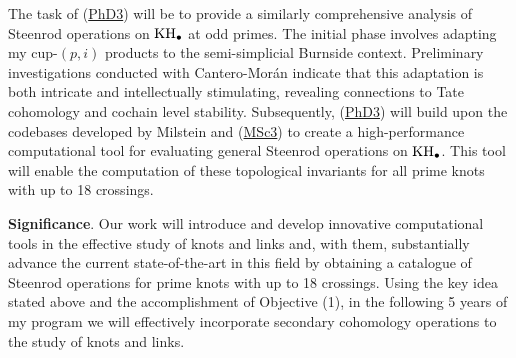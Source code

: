 \quad The task of (\underline{PhD3}) will be to provide a similarly comprehensive analysis of Steenrod operations on $\mathrm{KH}_\bullet$ at odd primes.
The initial phase involves adapting my cup-$(p,i)$ products \cite{medina2021may_st} to the semi-simplicial Burnside context.
Preliminary investigations conducted with Cantero-Mor\'an indicate that this adaptation is both intricate and intellectually stimulating, revealing connections to Tate cohomology and cochain level stability.
Subsequently, (\underline{PhD3}) will build upon the codebases developed by Milstein and (\underline{MSc3}) to create a high-performance computational tool for evaluating general Steenrod operations on $\mathrm{KH}_\bullet$.
This tool will enable the computation of these topological invariants for all prime knots with up to 18 crossings.

\smallskip\textbf{Significance}.
Our work will introduce and develop innovative computational tools in the effective study of knots and links and, with them, substantially advance the current state-of-the-art in this field by obtaining a catalogue of Steenrod operations for prime knots with up to 18 crossings.
Using the key idea stated above and the accomplishment of Objective (1), in the following 5 years of my program we will effectively incorporate secondary cohomology operations to the study of knots and links.